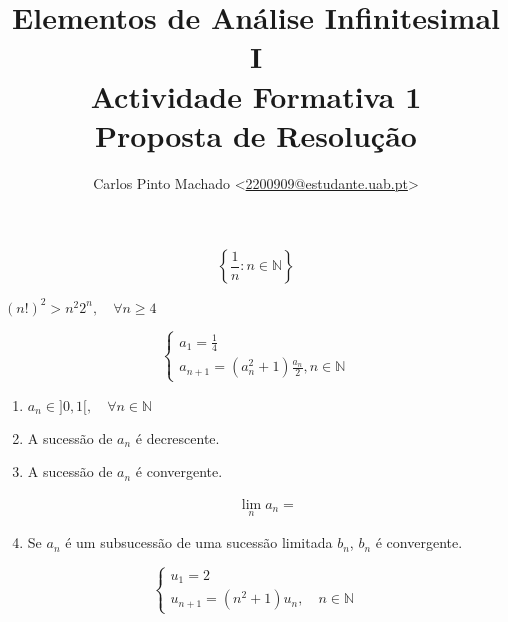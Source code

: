 \documentclass[11pt, a4paper]{article}
\title{
	Elementos de Análise Infinitesimal I\\
	Actividade Formativa 1\\
	Proposta de Resolução
}
\author{
	Carlos Pinto Machado
	<\href{mailto:2200909@estudante.uab.pt}{2200909@estudante.uab.pt}>
}
\begin{document}
\maketitle
\tableofcontents

\clearpage


\begin{equation}
	\left\{\frac{1}{n}: n \in \mathbb{N}\right\}
\end{equation}



\begin{proposition}
	$(n!)^2 > n^2 2^n, \quad \forall n \geq 4$
\end{proposition}

\clearpage


\begin{equation}
	\begin{cases}
		a_1 = \frac{1}{4}\\
		a_{n + 1} = (a^2_n + 1) \frac{a_n}{2}, n \in \mathbb{N}
	\end{cases}
\end{equation}

\begin{enumerate}[label=\arabic{section}.\arabic*.]
	\item
		\begin{proposition}
			$a_n \in ]0, 1[, \quad \forall n \in \mathbb{N}$
		\end{proposition}
	\item
		\begin{proposition}
			A sucessão de $a_n$ é decrescente.
		\end{proposition}
	\item
		\begin{proposition}
			A sucessão de $a_n$ é convergente.
		\end{proposition}
		\begin{align*}
			\lim_{n} a_n =
		\end{align*}
	\item
		\begin{proposition}
			Se $a_n$ é um subsucessão de uma sucessão limitada $b_n$, $b_n$ é
			convergente.
		\end{proposition}
\end{enumerate}


\begin{equation}
	\begin{cases}
		u_1 = 2\\
		u_{n + 1} = (n^2 + 1)u_n, \quad n \in \mathbb{N}
	\end{cases}
\end{equation}
\end{document}
